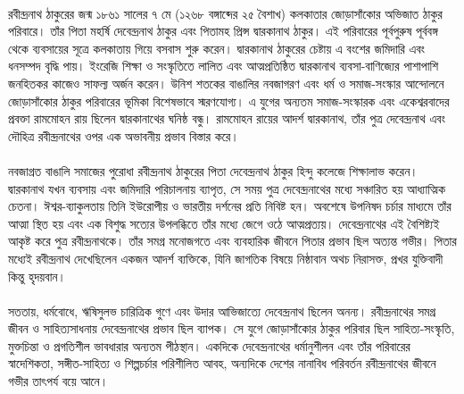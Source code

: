 \documentclass{article}
\begin{document}
\paragraph{}
রবীন্দ্রনাথ ঠাকুরের জন্ম ১৮৬১ সালের ৭ মে (১২৬৮ বঙ্গাব্দের ২৫ বৈশাখ) কলকাতার জোড়াসাঁকোর অভিজাত ঠাকুর পরিবারে। তাঁর পিতা মহর্ষি দেবেন্দ্রনাথ ঠাকুর এবং পিতামহ প্রিন্স দ্বারকানাথ ঠাকুর। এই পরিবারের পূর্বপুরুষ পূর্ববঙ্গ থেকে ব্যবসায়ের সূত্রে কলকাতায় গিয়ে বসবাস শুরু করেন। দ্বারকানাথ ঠাকুরের চেষ্টায় এ বংশের জমিদারি এবং ধনসম্পদ বৃদ্ধি পায়। ইংরেজি শিক্ষা ও সংস্কৃতিতে লালিত এবং আত্মপ্রতিষ্ঠিত দ্বারকানাথ ব্যবসা-বাণিজ্যের পাশাপাশি জনহিতকর কাজেও সাফল্য অর্জন করেন। উনিশ শতকের বাঙালির নবজাগরণ এবং ধর্ম ও সমাজ-সংস্কার আন্দোলনে জোড়াসাঁকোর ঠাকুর পরিবারের ভূমিকা বিশেষভাবে স্মরণযোগ্য। এ যুগের অন্যতম সমাজ-সংস্কারক এবং একেশ্বরবাদের প্রবক্তা রামমোহন রায় ছিলেন দ্বারকানাথের ঘনিষ্ঠ বন্ধু। রামমোহন রায়ের আদর্শ দ্বারকানাথ, তাঁর পুত্র দেবেন্দ্রনাথ এবং দৌহিত্র রবীন্দ্রনাথের ওপর এক অভাবনীয় প্রভাব বিস্তার করে।
\paragraph{}
নবজাগ্রত বাঙালি সমাজের পুরোধা রবীন্দ্রনাথ ঠাকুরের পিতা দেবেন্দ্রনাথ ঠাকুর হিন্দু কলেজে শিক্ষালাভ করেন। দ্বারকানাথ যখন ব্যবসায় এবং জমিদারি পরিচালনায় ব্যাপৃত, সে সময় পুত্র দেবেন্দ্রনাথের মধ্যে সঞ্চারিত হয় আধ্যাত্মিক চেতনা। ঈশ্বর-ব্যাকুলতায় তিনি ইউরোপীয় ও ভারতীয় দর্শনের প্রতি নিবিষ্ট হন। অবশেষে উপনিষদ চর্চার মাধ্যমে তাঁর আত্মা স্থিত হয় এবং এক বিশুদ্ধ সত্যের উপলব্ধিতে তাঁর মধ্যে জেগে ওঠে আত্মপ্রত্যয়। দেবেন্দ্রনাথের এই বৈশিষ্ট্যই আকৃষ্ট করে পুত্র রবীন্দ্রনাথকে। তাঁর সমগ্র মনোজগতে এবং ব্যবহারিক জীবনে পিতার প্রভাব ছিল অত্যন্ত গভীর। পিতার মধ্যেই রবীন্দ্রনাথ দেখেছিলেন একজন আদর্শ ব্যক্তিকে, যিনি জাগতিক বিষয়ে নিষ্ঠাবান অথচ নিরাসক্ত, প্রখর যুক্তিবাদী কিন্তু হৃদয়বান।
\paragraph{}
সততায়, ধর্মবোধে, ঋষিসুলভ চারিত্রিক গুণে এবং উদার আভিজাত্যে দেবেন্দ্রনাথ ছিলেন অনন্য। রবীন্দ্রনাথের সমগ্র জীবন ও সাহিত্যসাধনায় দেবেন্দ্রনাথের প্রভাব ছিল ব্যাপক। সে যুগে জোড়াসাঁকোর ঠাকুর পরিবার ছিল সাহিত্য-সংস্কৃতি, মুক্তচিন্তা ও প্রগতিশীল ভাবধারার অন্যতম পীঠস্থান। একদিকে দেবেন্দ্রনাথের ধর্মানুশীলন এবং তাঁর পরিবারের স্বাদেশিকতা, সঙ্গীত-সাহিত্য ও শিল্পচর্চার পরিশীলিত আবহ, অন্যদিকে দেশের নানাবিধ পরিবর্তন রবীন্দ্রনাথের জীবনে গভীর তাৎপর্য বয়ে আনে।
\end{document}
